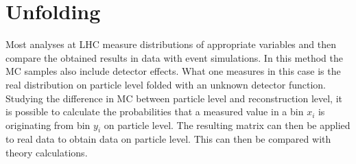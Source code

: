 \section{Unfolding}
	Most analyses at LHC measure distributions of appropriate variables and then compare the obtained results in data with event simulations. In this method the MC samples also include detector effects. What one measures in this case is the real distribution on particle level folded with an unknown detector function. Studying the difference in MC between particle level and reconstruction level, it is possible to calculate the probabilities that a measured value in a bin $x_i$ is originating from bin $y_i$ on particle level. The resulting matrix can then be applied to real data to obtain data on particle level. This can then be compared with theory calculations.
	